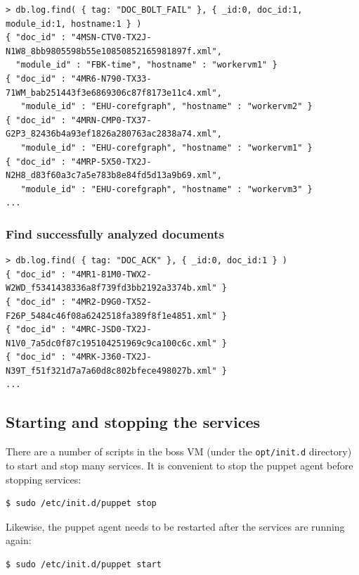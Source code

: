\documentclass[a4]{article}
\begin{document}
\begin{verbatim}
> db.log.find( { tag: "DOC_BOLT_FAIL" }, { _id:0, doc_id:1, module_id:1, hostname:1 } )
{ "doc_id" : "4MSN-CTV0-TX2J-N1W8_8bb9805598b55e10850852165981897f.xml", 
  "module_id" : "FBK-time", "hostname" : "workervm1" }
{ "doc_id" : "4MR6-N790-TX33-71WM_bab251443f3e6869306c87f8173e11c4.xml", 
   "module_id" : "EHU-corefgraph", "hostname" : "workervm2" }
{ "doc_id" : "4MRN-CMP0-TX37-G2P3_82436b4a93ef1826a280763ac2838a74.xml", 
   "module_id" : "EHU-corefgraph", "hostname" : "workervm1" }
{ "doc_id" : "4MRP-5X50-TX2J-N2H8_d83f60a3c7a5e783b8e84fd5d13a9b69.xml", 
   "module_id" : "EHU-corefgraph", "hostname" : "workervm3" }
...
\end{verbatim}

\subsubsection*{Find successfully analyzed documents}

\begin{verbatim}
> db.log.find( { tag: "DOC_ACK" }, { _id:0, doc_id:1 } )
{ "doc_id" : "4MR1-81M0-TWX2-W2WD_f5341438336a8f739fd3bb2192a3374b.xml" }
{ "doc_id" : "4MR2-D9G0-TX52-F26P_5484c46f08a6242518fa389f8f1e4851.xml" }
{ "doc_id" : "4MRC-JSD0-TX2J-N1V0_7a5dc0f87c195104251969c9ca100c6c.xml" }
{ "doc_id" : "4MRK-J360-TX2J-N39T_f51f321d7a7a60d8c802bfece498027b.xml" }
...
\end{verbatim}

\subsection{Starting and stopping the services}
\label{sec:start-stopp-serv}

There are a number of scripts in the boss VM (under the \texttt{opt/init.d}
directory) to start and stop many services. It is convenient to stop the
puppet agent before stopping services:

\begin{verbatim}
$ sudo /etc/init.d/puppet stop
\end{verbatim}

Likewise, the puppet agent needs to be restarted after the services are
running again:

\begin{verbatim}
$ sudo /etc/init.d/puppet start
\end{verbatim}
\end{document}
